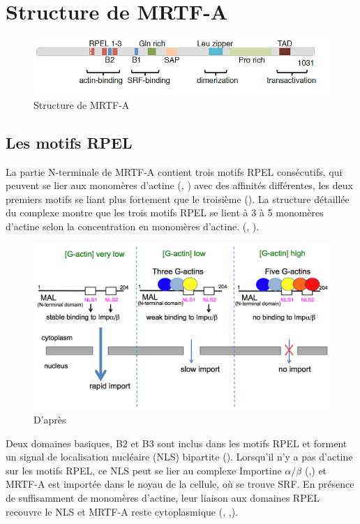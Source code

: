 \section{Structure de MRTF-A}

\begin{figure}[h!]
\center
\includegraphics[scale=0.5]{MRTFA_structure.png}
\caption{Structure de MRTF-A \parencite{scharenberg_tgf-_2014}}
\end{figure}
 \subsection{Les motifs RPEL}
 
 La partie N-terminale de MRTF-A contient trois motifs RPEL consécutifs, qui peuvent se lier aux monomères d'actine (\cite{posern_mutant_2004}, \cite{mouilleron_molecular_2008}) avec des affinités différentes, les deux premiers motifs se liant plus fortement que le troisième (\cite{guettler_rpel_2008}). La structure détaillée du complexe montre que les trois motifs RPEL se lient à 3 à 5 monomères d'actine selon la concentration en monomères d'actine. (\cite{hirano_sensing_2011}, \cite{treisman_structure_2011}). 
 
 
 \begin{figure}[h!]
 \includegraphics[scale=0.30]{MRTF-A_actines_complexes.png}
 \caption{D'après \cite{hirano_sensing_2011}\label{hirano}}
 \end{figure}
 Deux domaines basiques, B2 et B3 sont inclus dans les motifs RPEL et forment un signal de localisation nucléaire (NLS) bipartite (\cite{rajakyla_actin-regulated_2010}). Lorsqu'il n'y a pas d'actine sur les motifs RPEL, ce NLS peut se lier au complexe Importine $\alpha / \beta$ (\cite{hirano_sensing_2011},\cite{rajakyla_actin-regulated_2010}) et MRTF-A est importée dans le noyau de la cellule, où se trouve SRF. En présence de suffisamment de monomères d'actine, leur liaison aux domaines RPEL recouvre le NLS et MRTF-A reste cytoplasmique (\cite{posern_mutant_2002}, \cite{miralles_actin_2003},\cite{posern_mutant_2004}). 
 
